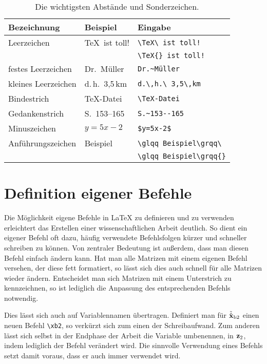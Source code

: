 \begin{table}
  \caption{Die wichtigsten Abstände und Sonderzeichen.}
  \label{tab:Sonderzeichen}
  \setlength{\tabcolsep}{1em}\centering
  \begin{tabular}{lll}\hline
    Bezeichnung			&	Beispiel				&	Eingabe\\\hline
    Leerzeichen			&	\TeX\ ist toll!			&	\verb*|\TeX\ ist toll!|\\
					    &							&	\verb*|\TeX{} ist toll!|\\
    festes Leerzeichen	&	Dr.~Müller				&	\verb|Dr.~Müller|\\
    kleines Leerzeichen	&	d.\,h.\ 3,5\,km			&	\verb*|d.\,h.\ 3,5\,km|\\
    Bindestrich			&	\TeX-Datei				&	\verb|\TeX-Datei|\\
    Gedankenstrich		&	S.~153--165				&	\verb|S.~153--165|\\
    Minuszeichen		&	$y=5x-2$				&	\verb|$y=5x-2$|\\
    Anführungszeichen	&	\glqq Beispiel\grqq\	&	\verb*|\glqq Beispiel\grqq\ |\\
						&							&	\verb*|\glqq Beispiel\grqq{}|\\\hline
  \end{tabular}
\end{table}



\section{Definition eigener Befehle}
Die Möglichkeit eigene Befehle in \LaTeX{} zu definieren und zu verwenden erleichtert das Erstellen einer wissenschaftlichen Arbeit deutlich.
So dient ein eigener Befehl oft dazu, häufig verwendete Befehlsfolgen kürzer und schneller schreiben zu können.
Von zentraler Bedeutung ist außerdem, dass man diesen Befehl einfach ändern kann.
Hat man \zB alle Matrizen mit einem eigenen Befehl versehen, der diese fett formatiert, so lässt sich dies auch schnell für alle Matrizen wieder ändern.
Entscheidet man sich Matrizen mit einem Unterstrich zu kennzeichnen, so ist lediglich die Anpassung des entsprechenden Befehls notwendig.

Dies lässt sich auch auf Variablennamen übertragen.
Definiert man \zB für $\tilde{\hat{{\boldsymbol{\mathrm{x}}}}}_\mathrm{b2}$ einen neuen Befehl \verb|\xb2|, so verkürzt sich zum einen der Schreibaufwand.
Zum anderen lässt sich selbst in der Endphase der Arbeit die Variable umbenennen, \zB in ${\boldsymbol{\mathrm{z}}}_2$, indem lediglich der Befehl verändert wird.
Die sinnvolle Verwendung eines Befehls setzt damit voraus, dass er auch immer verwendet wird.

